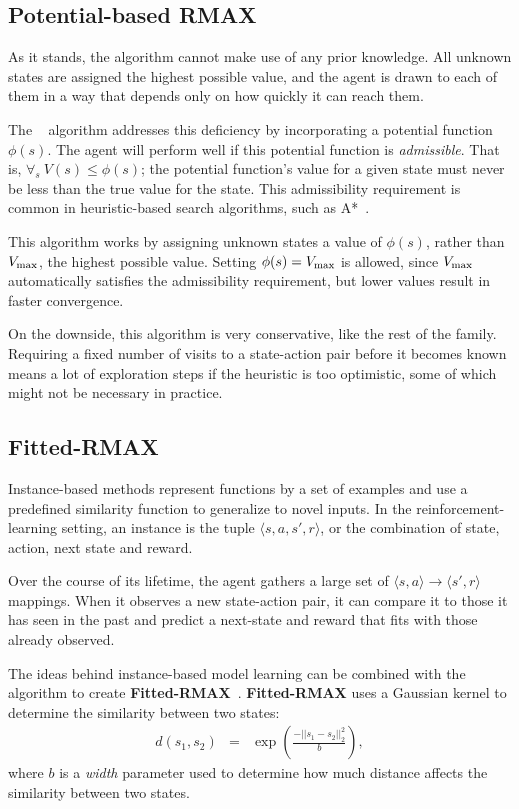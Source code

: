 \subsection{Potential-based RMAX}

As it stands, the  algorithm cannot make use of any prior knowledge. All unknown states are assigned the highest possible value, and the agent is drawn to each of them in a way that depends only on how quickly it can reach them.

The ~\cite{asmuth08} algorithm addresses this deficiency by incorporating a potential function $\phi(s)$. The agent will perform well if this potential function is \emph{admissible}. That is, $\forall_s ~ V(s) \leq \phi(s)$; the potential function's value for a given state must never be less than the true value for the state. This admissibility requirement is common in heuristic-based search algorithms, such as A*~\cite{russell1995artificial}.

This algorithm works by assigning unknown states a value of $\phi(s)$, rather than $V_{\rm max}$, the highest possible value. Setting $\phi(s)=V_{\rm max}$ is allowed, since $V_{\rm max}$ automatically satisfies the admissibility requirement, but lower values result in faster convergence.

On the downside, this algorithm is very conservative, like the rest of the  family. Requiring a fixed number of visits to a state-action pair before it becomes known means a lot of exploration steps if the heuristic is too optimistic, some of which might not be necessary in practice.


\subsection{Fitted-RMAX}

Instance-based methods represent functions by a set of examples and use a predefined similarity function to generalize to novel inputs. In the reinforcement-learning setting, an instance is the tuple $\langle s, a, s', r \rangle$, or the combination of state, action, next state and reward.

Over the course of its lifetime, the agent gathers a large set of $\langle s, a\rangle \rightarrow \langle s', r \rangle$ mappings. When it observes a new state-action pair, it can compare it to those it has seen in the past and predict a next-state and reward that fits with those already observed.

The ideas behind instance-based model learning can be combined with the  algorithm to create {\bf Fitted-RMAX}~\cite{jong07}. {\bf Fitted-RMAX} uses a Gaussian kernel to determine the similarity between two states:
\begin{eqnarray}
d(s_1,s_2)&=&\exp\left(\frac{-||s_1 - s_2||^2_2}{b}\right),
\end{eqnarray}
where $b$ is a \emph{width} parameter used to determine how much distance affects the similarity between two states.

